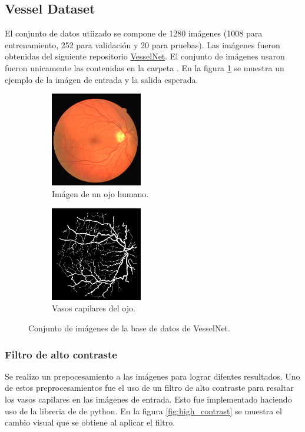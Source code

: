 \subsection{Vessel Dataset}

El conjunto de datos utiizado se compone de 1280 imágenes (1008 para entrenamiento, 252 para validación y 20 para pruebas). Las imágenes fueron obtenidas del siguiente repositorio \href{https://www.kaggle.com/datasets/srinjoybhuiya/VesselNet-code}{VesselNet}. El conjunto de imágenes usaron fueron unicamente las contenidas en la carpeta . En la figura \ref{fig:vesselnet} se muestra un ejemplo de la imágen de entrada y la salida esperada.

\begin{figure}[H]
    \centering
    \begin{subfigure}{6cm}
        \centering
        \includegraphics[width=4cm]{Graphics/train.jpg}
        \caption{Imágen de un ojo humano.}
    \end{subfigure}
    \begin{subfigure}{6cm}
        \centering
        \includegraphics[width=4cm]{Graphics/mask.png}
        \caption{Vasos capilares del ojo.}
    \end{subfigure}
    \caption{Conjunto de imágenes de la base de datos de VesselNet.}
    \label{fig:vesselnet}
\end{figure}

\subsubsection{Filtro de alto contraste}

Se realizo un prepocesamiento a las imágenes para lograr difentes resultados. Uno de estos preprocesamientos fue el uso de un filtro de alto contraste para resaltar los vasos capilares en las imágenes de entrada. Esto fue implementado haciendo uso de la libreria de  de python. En la figura \ref{fig:high_contrast} se muestra el cambio visual que se obtiene al aplicar el filtro.

